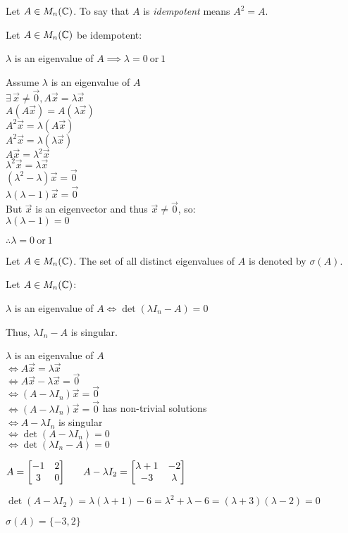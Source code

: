 \documentclass[letterpaper,12pt,fleqn]{article}
\newcommand{\vx}{\vec{x}}
\newcommand{\vz}{\vec{0}}
\renewcommand{\l}{\lambda}
\renewcommand{\o}{\sigma}
\newcommand{\hs}{\hspace{4ex}}
\begin{document}
\newpage

\begin{definition}
  Let $A\in M_n(\mathbb{C})$. To say that $A$ is \emph{idempotent} means $A^2=A$.
\end{definition}

\begin{theorem}
  Let $A\in M_n(\mathbb{C})$ be idempotent:

  $\l$ is an eigenvalue of $A\implies\l=0\ \mbox{or}\ 1$
\end{theorem}

\begin{theproof}
  Assume $\l$ is an eigenvalue of $A$ \\
  $\exists\,\vx\ne\vz,A\vx=\l\vx$ \\
  $A(A\vx)=A(\l\vx)$ \\
  $A^2\vx=\l(A\vx)$ \\
  $A^2\vx=\l(\l\vx)$ \\
  $A\vx=\l^2\vx$ \\
  $\l^2\vx=\l\vx$ \\
  $(\l^2-\l)\vx=\vz$ \\
  $\l(\l-1)\vx=\vz$ \\
  But $\vx$ is an eigenvector and thus $\vx\ne\vz$, so: \\
  $\l(\l-1)=0$

  $\therefore \l=0\ \mbox{or}\ 1$
\end{theproof}

\begin{notation}
  Let $A\in M_n(\mathbb{C})$. The set of all distinct eigenvalues of $A$ is denoted by
  $\o(A)$.
\end{notation}

\begin{theorem}
  Let $A\in M_n(\mathbb{C})$:

  $\l$ is an eigenvalue of $A\iff\det(\l I_n-A)=0$

  Thus, $\l I_n-A$ is singular.
\end{theorem}

\begin{theproof}
  $\l$ is an eigenvalue of $A$ \\
  $\iff A\vx=\l\vx$ \\
  $\iff A\vx-\l\vx=\vz$ \\
  $\iff (A-\l I_n)\vx=\vz$ \\
  $\iff (A-\l I_n)\vx=\vz$ has non-trivial solutions \\
  $\iff A-\l I_n$ is singular \\
  $\iff \det(A-\l I_n)=0$ \\
  $\iff \det(\l I_n-A)=0$
\end{theproof}

\newpage

\begin{example}
  $A=\AA\hs A-\l I_2=\begin{bmatrix} \l+1 & -2 \\ -3 & \l \end{bmatrix}$

  $\det(A-\l I_2)=\l(\l+1)-6=\l^2+\l-6=(\l+3)(\l-2)=0$

  $\o(A)=\{-3,2\}$
\end{example}
\end{document}
